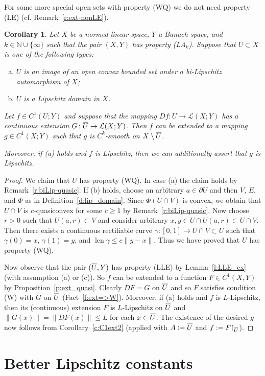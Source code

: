 \documentclass[a4paper,twoside,10pt,reqno,draft]{amsart}
\newtheorem{corollary}[theorem]{Corollary}
\theoremstyle{definition}
\theoremstyle{remark}
\newcommand\norm[1]{\mathopen\|#1\mathclose\|}
\newcommand{\cl}[2][3]{{}\mkern#1mu\overline{\mkern-#1mu#2}}
\newcommand\ga{\gamma}
\newcommand\N{{\mathbb N}}
\newcommand\restr[1]{\mathclose\restriction_{#1}}
\newcommand\bdry{\partial}
\DeclareMathOperator{\len}{len}
\newcommand\lin[2]{\mathcal L(#1;#2)}
\newcommand\eqdef{\mathrel{\mathop:}=}
\newcommand\pLA[1]{(LA$_#1$)}
\newcommand\pLLE{(LLE)}
\newcommand\pLE{(LE)}
\newcommand\pWQ{(WQ)}
\newcommand\cW{(W)}
\begin{document}
For some more special open sets with property {\pWQ} we do not need property {\pLE} (cf. Remark~\ref{r:ext-nonLE}).
\begin{corollary}
Let $X$ be a normed linear space, $Y$ a Banach space, and $k\in\N\cup\{\infty\}$ such that the pair $(X,Y)$ has property \pLA k.
Suppose that $U\subset X$ is one of the following types:
\begin{enumerate}[(a)]
\item $U$ is an image of an open convex bounded set under a bi-Lipschitz automorphism of $X$;
\item $U$ is a Lipschitz domain in $X$.
\end{enumerate}
Let $f\in C^1(U;Y)$ and suppose that the mapping $Df\colon U\to\lin XY$ has a continuous extension $G\colon\cl[1]U\to\lin XY$.
Then $f$ can be extended to a mapping $g\in C^1(X;Y)$ such that $g$ is $C^k$-smooth on $X\setminus\cl[1]U$.

Moreover, if (a) holds and $f$ is Lipschitz, then we can additionally assert that $g$ is Lipschitz.
\end{corollary}
\begin{proof}
We claim that $U$ has property {\pWQ}.
In case (a) the claim holds by Remark~\ref{r:biLip-quasic}.
If (b) holds, choose an arbitrary $a\in\bdry U$ and then $V$, $E$, and $\Phi$ as in Definition~\ref{d:lip_domain}.
Since $\Phi(U\cap V)$ is convex, we obtain that $U\cap V$ is $c$-quasiconvex for some $c\ge1$ by Remark~\ref{r:biLip-quasic}.
Now choose $r>0$ such that $U(a,r)\subset V$ and consider arbitrary $x,y\in U\cap U(a,r)\subset U\cap V$.
Then there exists a continuous rectifiable curve $\ga\colon[0,1]\to U\cap V\subset U$ such that $\ga(0)=x$, $\ga(1)=y$, and $\len\ga\le c\norm{y-x}$.
Thus we have proved that $U$ has property \pWQ.

Now observe that the pair $(\cl[1]U,Y)$ has property {\pLLE} by Lemma~\ref{l:LLE_ex} (with assumption (a) or (c)).
So $f$ can be extended to a function $F\in C^1(X,Y)$ by Proposition~\ref{p:ext_quasi}.
Clearly $DF=G$ on $\cl[1]U$ and so $F$ satisfies condition {\cW} with $G$ on $\cl[1]U$ (Fact~\ref{f:ext=>W}).
Moreover, if (a) holds and $f$ is $L$-Lipschitz, then its (continuous) extension $F$ is $L$-Lipschitz on $\cl[1]U$ and $\norm{G(x)}=\norm{DF(x)}\le L$ for each $x\in\cl[1]U$.
The existence of the desired $g$ now follows from Corollary~\ref{c:C1ext2} (applied with $A\eqdef\cl[1]U$ and $f\eqdef F\restr{\cl[1]U}$).
\end{proof}

\section{Better Lipschitz constants}\label{sec:Lip}
\end{document}
